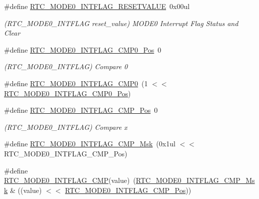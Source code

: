 \begin{DoxyCompactItemize}
\#define \mbox{\hyperlink{group___s_a_m_d21___r_t_c_ga929361fd8ec24d3db79e1a77fd500741}{R\+T\+C\+\_\+\+M\+O\+D\+E0\+\_\+\+I\+N\+T\+F\+L\+A\+G\+\_\+\+R\+E\+S\+E\+T\+V\+A\+L\+UE}}~0x00ul
\begin{DoxyCompactList}\small\item\em (R\+T\+C\+\_\+\+M\+O\+D\+E0\+\_\+\+I\+N\+T\+F\+L\+AG reset\+\_\+value) M\+O\+D\+E0 Interrupt Flag Status and Clear \end{DoxyCompactList}\item 
\#define \mbox{\hyperlink{group___s_a_m_d21___r_t_c_ga79c0e8136c7f52ba4d7dd74900f9c096}{R\+T\+C\+\_\+\+M\+O\+D\+E0\+\_\+\+I\+N\+T\+F\+L\+A\+G\+\_\+\+C\+M\+P0\+\_\+\+Pos}}~0
\begin{DoxyCompactList}\small\item\em (R\+T\+C\+\_\+\+M\+O\+D\+E0\+\_\+\+I\+N\+T\+F\+L\+AG) Compare 0 \end{DoxyCompactList}\item 
\#define \mbox{\hyperlink{group___s_a_m_d21___r_t_c_gafd4fd25be5a0ba51b7eb783af1f59cf3}{R\+T\+C\+\_\+\+M\+O\+D\+E0\+\_\+\+I\+N\+T\+F\+L\+A\+G\+\_\+\+C\+M\+P0}}~(1 $<$$<$ \mbox{\hyperlink{group___s_a_m_d21___r_t_c_ga79c0e8136c7f52ba4d7dd74900f9c096}{R\+T\+C\+\_\+\+M\+O\+D\+E0\+\_\+\+I\+N\+T\+F\+L\+A\+G\+\_\+\+C\+M\+P0\+\_\+\+Pos}})
\item 
\#define \mbox{\hyperlink{group___s_a_m_d21___r_t_c_gac0320bb38db6d1e4ae60040c73789f33}{R\+T\+C\+\_\+\+M\+O\+D\+E0\+\_\+\+I\+N\+T\+F\+L\+A\+G\+\_\+\+C\+M\+P\+\_\+\+Pos}}~0
\begin{DoxyCompactList}\small\item\em (R\+T\+C\+\_\+\+M\+O\+D\+E0\+\_\+\+I\+N\+T\+F\+L\+AG) Compare x \end{DoxyCompactList}\item 
\#define \mbox{\hyperlink{group___s_a_m_d21___r_t_c_ga24ffecb21146e238ec0af4f59a45bacd}{R\+T\+C\+\_\+\+M\+O\+D\+E0\+\_\+\+I\+N\+T\+F\+L\+A\+G\+\_\+\+C\+M\+P\+\_\+\+Msk}}~(0x1ul $<$$<$ R\+T\+C\+\_\+\+M\+O\+D\+E0\+\_\+\+I\+N\+T\+F\+L\+A\+G\+\_\+\+C\+M\+P\+\_\+\+Pos)
\item 
\#define \mbox{\hyperlink{group___s_a_m_d21___r_t_c_ga383c9e957b79ae56d59b934d4bdbce0b}{R\+T\+C\+\_\+\+M\+O\+D\+E0\+\_\+\+I\+N\+T\+F\+L\+A\+G\+\_\+\+C\+MP}}(value)~(\mbox{\hyperlink{group___s_a_m_d21___r_t_c_ga24ffecb21146e238ec0af4f59a45bacd}{R\+T\+C\+\_\+\+M\+O\+D\+E0\+\_\+\+I\+N\+T\+F\+L\+A\+G\+\_\+\+C\+M\+P\+\_\+\+Msk}} \& ((value) $<$$<$ \mbox{\hyperlink{group___s_a_m_d21___r_t_c_gac0320bb38db6d1e4ae60040c73789f33}{R\+T\+C\+\_\+\+M\+O\+D\+E0\+\_\+\+I\+N\+T\+F\+L\+A\+G\+\_\+\+C\+M\+P\+\_\+\+Pos}}))
$$
\end{DoxyCompactItemize}
